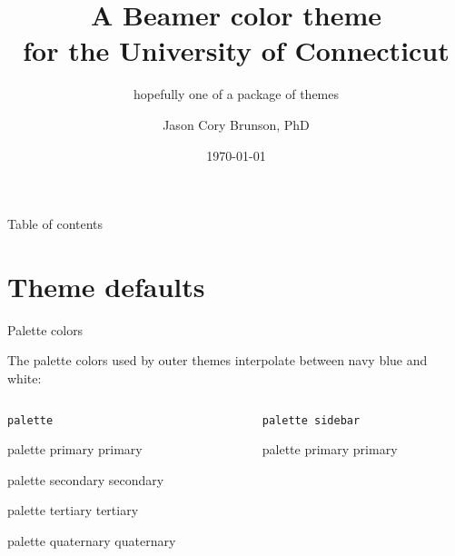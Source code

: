 \documentclass{beamer}
\title[Beamer colors for UConn]{A Beamer color theme\\ for the University of Connecticut}
\subtitle{hopefully one of a package of themes}
\author[Cory Brunson]{Jason Cory Brunson, PhD}
\institute[UConn Health]{Center for Quantitative Medicine\\ University of Connecticut School of Medicine}
\date{\today}
\begin{document}
\begin{frame}
\titlepage
\end{frame}


\begin{frame}{Table of contents}
\tableofcontents
\end{frame}


\section{Theme defaults}

\begin{frame}[fragile]{Palette colors}

The palette colors used by outer themes interpolate between navy blue and white:

\vfill

\begin{columns}
\begin{column}{.5\textwidth}

\centering
\verb|palette|
\vspace{1ex}

\begin{beamercolorbox}[sep=4pt,center]{palette primary}
primary
\end{beamercolorbox}

\begin{beamercolorbox}[sep=4pt,center]{palette secondary}
secondary
\end{beamercolorbox}

\begin{beamercolorbox}[sep=4pt,center]{palette tertiary}
tertiary
\end{beamercolorbox}

\begin{beamercolorbox}[sep=4pt,center]{palette quaternary}
quaternary
\end{beamercolorbox}

\end{column}
\begin{column}{.5\textwidth}

\centering
\verb|palette sidebar|
\vspace{1ex}

\begin{beamercolorbox}[sep=4pt,center]{palette primary}
primary
\end{beamercolorbox}


\end{column}
\end{columns}
\end{frame}
\end{document}
